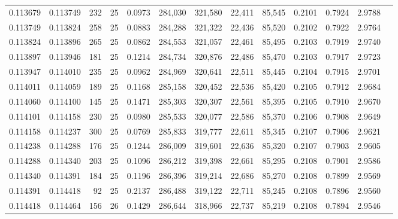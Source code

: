 \begin{tabular}{rrrrrrrrrrrrr}
0.113679 & 0.113749 &   232 &  25 &                                     0.0973 & 284,030 & 321,580 &  22,411 &  85,545 & 0.2101 & 0.7924 & 2.9788 \\
0.113749 & 0.113824 &   258 &  25 &                                     0.0883 & 284,288 & 321,322 &  22,436 &  85,520 & 0.2102 & 0.7922 & 2.9764 \\
0.113824 & 0.113896 &   265 &  25 &                                     0.0862 & 284,553 & 321,057 &  22,461 &  85,495 & 0.2103 & 0.7919 & 2.9740 \\
0.113897 & 0.113946 &   181 &  25 &                                     0.1214 & 284,734 & 320,876 &  22,486 &  85,470 & 0.2103 & 0.7917 & 2.9723 \\
0.113947 & 0.114010 &   235 &  25 &                                     0.0962 & 284,969 & 320,641 &  22,511 &  85,445 & 0.2104 & 0.7915 & 2.9701 \\
0.114011 & 0.114059 &   189 &  25 &                                     0.1168 & 285,158 & 320,452 &  22,536 &  85,420 & 0.2105 & 0.7912 & 2.9684 \\
0.114060 & 0.114100 &   145 &  25 &                                     0.1471 & 285,303 & 320,307 &  22,561 &  85,395 & 0.2105 & 0.7910 & 2.9670 \\
0.114101 & 0.114158 &   230 &  25 &                                     0.0980 & 285,533 & 320,077 &  22,586 &  85,370 & 0.2106 & 0.7908 & 2.9649 \\
0.114158 & 0.114237 &   300 &  25 &                                     0.0769 & 285,833 & 319,777 &  22,611 &  85,345 & 0.2107 & 0.7906 & 2.9621 \\
0.114238 & 0.114288 &   176 &  25 &                                     0.1244 & 286,009 & 319,601 &  22,636 &  85,320 & 0.2107 & 0.7903 & 2.9605 \\
0.114288 & 0.114340 &   203 &  25 &                                     0.1096 & 286,212 & 319,398 &  22,661 &  85,295 & 0.2108 & 0.7901 & 2.9586 \\
0.114340 & 0.114391 &   184 &  25 &                                     0.1196 & 286,396 & 319,214 &  22,686 &  85,270 & 0.2108 & 0.7899 & 2.9569 \\
0.114391 & 0.114418 &    92 &  25 &                                     0.2137 & 286,488 & 319,122 &  22,711 &  85,245 & 0.2108 & 0.7896 & 2.9560 \\
0.114418 & 0.114464 &   156 &  26 &                                     0.1429 & 286,644 & 318,966 &  22,737 &  85,219 & 0.2108 & 0.7894 & 2.9546 \\

\end{tabular}

